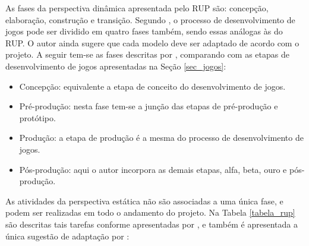 \documentclass[quali]{ppgccufscar}
\begin{document}
As fases da perspectiva dinâmica apresentada pelo RUP são: concepção, elaboração, construção e transição. Segundo , o processo de desenvolvimento de jogos pode ser dividido em quatro fases também, sendo essas análogas às do RUP. O autor ainda sugere que cada modelo deve ser adaptado de acordo com o projeto. A seguir tem-se as fases descritas por , comparando com as etapas de desenvolvimento de jogos apresentadas na Seção \ref{sec_jogos}:

\begin{itemize}
	\item Concepção: equivalente a etapa de conceito do desenvolvimento de jogos.
	\item Pré-produção: nesta fase tem-se a junção das etapas de pré-produção e protótipo.
	\item Produção: a etapa de produção é a mesma do processo de desenvolvimento de jogos.
	\item Pós-produção: aqui o autor incorpora as demais etapas, alfa, beta, ouro e pós-produção.
\end{itemize}

As atividades da perspectiva estática não são associadas a uma única fase, e podem ser realizadas em todo o andamento do projeto. Na Tabela \ref{tabela_rup} são descritas tais tarefas conforme apresentadas por , e também é apresentada a única sugestão de adaptação por :
\end{document}
